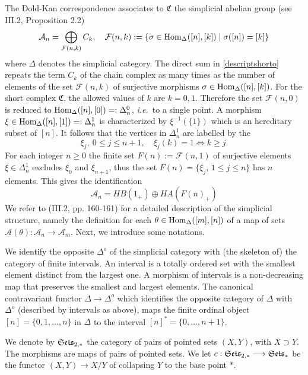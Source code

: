 \documentclass[cupthm]{CUP-JNL-JMJ}
\numberwithin{equation}{section}
\theoremstyle{cupplain}
\theoremstyle{cupdefinition}
\theoremstyle{cupremark}
\theoremstyle{cupproof}
\def\cA{{\mathcal A}}
\def\cF{{\mathcal F}}
\def\Se{\frak{ Sets}}
\def\Ses{{\Se_*}}
\def\Hom {{\rm{Hom}}}
\def\dop{{\Delta^o}}
\def\crel{{\Se_{2,*}}}
\newcommand{\ie}{{\it i.e.\/}\ }
\begin{document}
\begin{appendix}
  The Dold-Kan correspondence associates to $\mathfrak C$ the  simplicial abelian group (see \cite{GJ} III.2, Proposition 2.2) 
  \begin{equation}\label{descriptshorto}
\cA_n=\bigoplus_{\cF(n,k)} C_k, \quad \cF(n,k):=\{\sigma\in \Hom_\Delta([n],[k])\mid \sigma([n])=[k]\}
\end{equation}
where $\Delta$ denotes the simplicial category.
The direct sum in \eqref{descriptshorto} repeats the term $C_k$ of the chain complex as many times as  the number of elements of  the set $\cF(n,k)$ of surjective morphisms $\sigma\in \Hom_\Delta([n],[k])$. For the short complex  $\mathfrak C$, the allowed values of $k$ are $k=0,1$. Therefore the set $\cF(n,0)$ is  reduced to   $\Hom_\Delta([n],[0])=:\Delta_n^0$, \ie to a single point.  A morphism  $\xi\in\Hom_\Delta([n],[1])=:\Delta^1_n$ is characterized by  $\xi^{-1}(\{1\})$ which is an hereditary subset of $[n]$. It follows that the  vertices in $\Delta^1_n$  are   labelled by the
\begin{equation}\label{identxi}
\xi_j, ~ 0\leq j\leq n+1, \quad \xi_j(k)=1\iff k\geq  j.
\end{equation}
 For each integer $n\geq 0$  the finite set $F(n):=\cF(n,1)$ of surjective elements  $\xi\in\Delta^1_n$  excludes $\xi_{0}$ and  $\xi_{n+1}$, thus the set $F(n)=\{\xi_j, \, 1\leq j\leq n \}$ has $n$ elements. This gives the  identification  
 \begin{equation}
\cA_n= HB(1_+)\oplus HA(F(n)_+)\label{descriptshort}
\end{equation}  
We refer  to \cite{GJ} (III.2, pp. 160-161) for a detailed description of  the simplicial structure,   namely the definition  for each $\theta \in
 \Hom_\Delta([m],[n])$ of a map of sets $\cA(\theta):\cA_n\to \cA_m$. 
 Next, we introduce some notations.
 
  We  identify the  opposite  $\dop$  of the simplicial category with (the skeleton of) the category of finite intervals.   An interval  is  a totally ordered set with the smallest element distinct from the largest one.  A morphism of intervals is a non-decreasing map  that preserves the smallest and largest elements. The canonical contravariant functor  $\Delta\longrightarrow \dop$   which identifies the opposite category of  $\Delta$  with  $\dop$ (described by intervals as above),  maps the  finite ordinal object $[n]=\{0,1,\ldots,n\}$ in $\Delta$  to the interval $[n]^*=\{0, \ldots, n+1\}$. 

We denote by $\crel$    the category of pairs  of pointed sets $(X,Y)$, with $X\supset Y$. The morphisms are maps  of pairs of pointed sets. We let $c:\crel\longrightarrow \Ses$ be the functor $(X,Y)\to X/Y$  of collapsing  $Y$ to the base point $\ast$.


\end{appendix}
\end{document}
